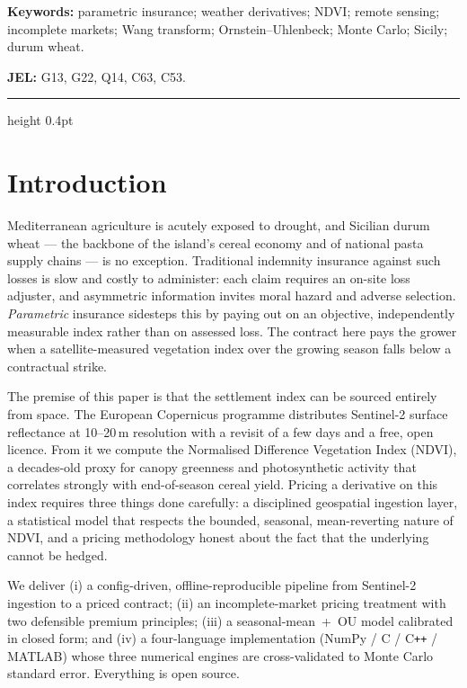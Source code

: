 \documentclass[11pt]{article}
\begin{document}
\smallskip
{\footnotesize\textbf{Keywords:} parametric insurance; weather derivatives;
NDVI; remote sensing; incomplete markets; Wang transform; Ornstein--Uhlenbeck;
Monte Carlo; Sicily; durum wheat.\par
\textbf{JEL:} G13, G22, Q14, C63, C53.}

\vspace{0.6em}
\hrule height 0.4pt
\vspace{0.4em}

\section{Introduction}
Mediterranean agriculture is acutely exposed to drought, and Sicilian durum
wheat --- the backbone of the island's cereal economy and of national pasta
supply chains --- is no exception. Traditional indemnity insurance against such
losses is slow and costly to administer: each claim requires an on-site loss
adjuster, and asymmetric information invites moral hazard and adverse selection.
\emph{Parametric} insurance sidesteps this by paying out on an objective,
independently measurable index rather than on assessed loss. The contract here
pays the grower when a satellite-measured vegetation index over the growing
season falls below a contractual strike.

The premise of this paper is that the settlement index can be sourced entirely
from space. The European Copernicus programme distributes Sentinel-2 surface
reflectance at 10--20\,m resolution with a revisit of a few days and a free,
open licence. From it we compute the Normalised Difference Vegetation Index
(NDVI), a decades-old proxy for canopy greenness and photosynthetic activity
that correlates strongly with end-of-season cereal yield. Pricing a derivative
on this index requires three things done carefully: a disciplined geospatial
ingestion layer, a statistical model that respects the bounded, seasonal,
mean-reverting nature of NDVI, and a pricing methodology honest about the fact
that the underlying cannot be hedged.

\begin{keybox}[title=Contribution]
We deliver (i) a config-driven, offline-reproducible pipeline from Sentinel-2
ingestion to a priced contract; (ii) an incomplete-market pricing treatment with
two defensible premium principles; (iii) a seasonal-mean~+~OU model calibrated in
closed form; and (iv) a four-language implementation (NumPy / C / C\texttt{++} /
MATLAB) whose three numerical engines are cross-validated to Monte Carlo standard
error. Everything is open source.
\end{keybox}
\end{document}
